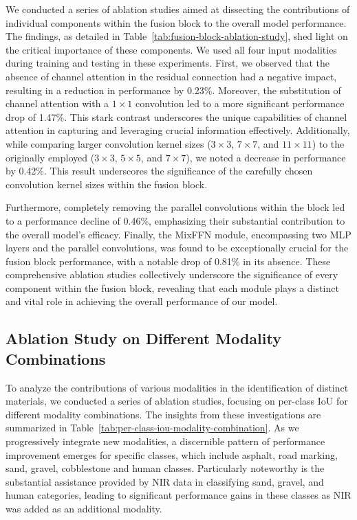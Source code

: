 \documentclass{article}
\begin{document}
We conducted a series of ablation studies aimed at dissecting the contributions of individual components within the fusion block to the overall model performance. The findings, as detailed in Table~\ref{tab:fusion-block-ablation-study}, shed light on the critical importance of these components. We used all four input modalities during training and testing in these experiments. First, we observed that the absence of channel attention in the residual connection had a negative impact, resulting in a reduction in performance by 0.23\%. Moreover, the substitution of channel attention with a $1\times 1$ convolution led to a more significant performance drop of 1.47\%. This stark contrast underscores the unique capabilities of channel attention in capturing and leveraging crucial information effectively. Additionally, while comparing larger convolution kernel sizes ($3\times3$, $7\times 7$, and $11\times 11$) to the originally employed ($3\times3$, $5\times 5$, and $7\times 7$), we noted a decrease in performance by 0.42\%. This result underscores the significance of the carefully chosen convolution kernel sizes within the fusion block.

Furthermore, completely removing the parallel convolutions within the block led to a performance decline of 0.46\%, emphasizing their substantial contribution to the overall model's efficacy. Finally, the MixFFN module, encompassing two MLP layers and the parallel convolutions, was found to be exceptionally crucial for the fusion block performance, with a notable drop of 0.81\% in its absence. These comprehensive ablation studies collectively underscore the significance of every component within the fusion block, revealing that each module plays a distinct and vital role in achieving the overall performance of our model. 

\subsection{Ablation Study on Different Modality Combinations}

To analyze the contributions of various modalities in the identification of distinct materials, we conducted a series of ablation studies, focusing on per-class IoU for different modality combinations. The insights from these investigations are summarized in Table~\ref{tab:per-class-iou-modality-combination}. As we progressively integrate new modalities, a discernible pattern of performance improvement emerges for specific classes, which include asphalt, road marking, sand, gravel, cobblestone and human classes. Particularly noteworthy is the substantial assistance provided by NIR data in classifying sand, gravel, and human categories, leading to significant performance gains in these classes as NIR was added as an additional modality. 
\end{document}
